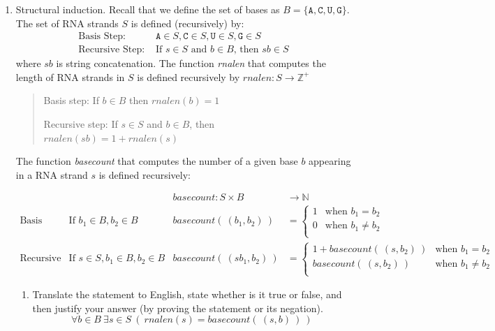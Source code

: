 \documentclass[12pt, oneside]{article}
\newcommand{\A}[0]{\texttt{A}}
\newcommand{\C}[0]{\texttt{C}}
\newcommand{\G}[0]{\texttt{G}}
\newcommand{\U}[0]{\texttt{U}}
\begin{document}
\begin{enumerate}[labelindent=0pt, leftmargin=0pt]
    \item Structural induction. Recall that we define the set of bases as $B  =  \{ \A, \C, \U, \G \}$.
The set of RNA strands $S$ is defined (recursively) by:
\[
\begin{array}{ll}
\textrm{Basis Step: } & \A \in S, \C \in S, \U \in S, \G \in S \\
\textrm{Recursive Step: } & \textrm{If } s \in S\textrm{ and }b \in B \textrm{, then }sb \in S
\end{array}
\]
where $sb$ is string concatenation. 
The function \textit{rnalen} that computes the length of RNA strands in $S$ is defined recursively by
$rnalen: S  \to \mathbb{Z}^+$


\begin{quote}
Basis step: If $b \in B$ then $rnalen(b)  = 1$

Recursive step: If $s \in S$ and $b \in B$, then $rnalen(sb)  = 1 + rnalen(s)$
\end{quote}

The function \textit{basecount} that computes the number of a given base 
$b$ appearing in a RNA strand $s$ is defined recursively:
    
\[
\begin{array}{llll}
& & \textit{basecount} : S \times B & \to \mathbb{N} \\
\textrm{Basis Step:} &  \textrm{If } b_1 \in B, b_2 \in B & \textit{basecount}(~(b_1, b_2)~) & =
        \begin{cases}
            1 & \textrm{when } b_1 = b_2 \\
            0 & \textrm{when } b_1 \neq b_2 \\
        \end{cases} \\
\textrm{Recursive Step:} & \textrm{If } s \in S, b_1 \in B, b_2 \in B &\textit{basecount}(~(s b_1, b_2)~) & =
        \begin{cases}
            1 + \textit{basecount}(~(s, b_2)~) & \textrm{when } b_1 = b_2 \\
            \textit{basecount}(~(s, b_2)~) & \textrm{when } b_1 \neq b_2 \\
        \end{cases}
\end{array}
\]
\begin{enumerate}
\item 
Translate the statement to English, state whether is it true or false, and then justify your answer (by proving the statement or its negation).
$$\forall b \in B ~\exists s \in S ~(~rnalen(s) = basecount(~(s,b)~)~)$$


\end{enumerate}
\end{enumerate}
\end{document}
